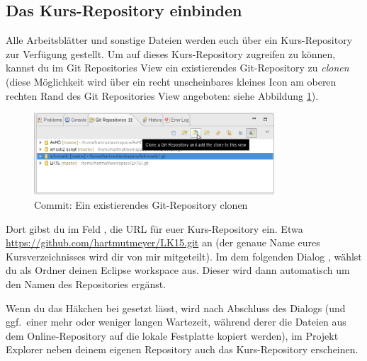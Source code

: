 \subsection{Das Kurs-Repository einbinden}


Alle Arbeitsblätter und sonstige Dateien werden euch über ein Kurs-Repository
zur Verfügung gestellt. Um auf dieses Kurs-Repository zugreifen zu können,
kannst du im Git Repositories View ein existierendes Git-Repository zu
\emph{clonen} (diese Möglichkeit wird über ein recht unscheinbares kleines Icon
am oberen rechten Rand des Git Repositories View angeboten: siehe Abbildung
\ref{fig:git-clone}).

\begin{figure}[h]
  \centering
   \includegraphics[width=0.8\textwidth]{./inf/SEKII/01_Vorbereitung/Cloning_a_Git_Repository.png}
   \caption{Commit: Ein existierendes Git-Repository clonen}
   \label{fig:git-clone}
\end{figure}

Dort gibst du im Feld , die URL für euer Kurs-Repository ein. Etwa
\url{https://github.com/hartmutmeyer/LK15.git} an (der genaue Name eures
Kursverzeichnisses wird dir von mir mitgeteilt). Im dem folgenden Dialog
, wählst du als Ordner deinen
Eclipse workspace aus. Dieser wird dann automatisch um den Namen des
Repositories ergänst.

Wenn du das Häkchen bei  gesetzt lässt, wird nach Abschluss des Dialogs (und ggf.\ einer mehr
oder weniger langen Wartezeit, während derer die Dateien aus dem
Online-Repository auf die lokale Festplatte kopiert werden), im Projekt Explorer
neben deinem eigenen Repository auch das Kurs-Repository erscheinen.


